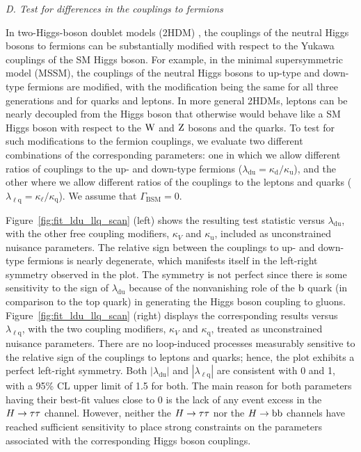 \documentclass[12pt,twoside,a4paper,cmspaper,final,collab]{cms-tdr}
\begin{document}
\textit{D. Test for differences  in the couplings to fermions}

In  two-Higgs-boson doublet models (2HDM) \cite{Branco:2011iw}, the couplings of the neutral Higgs bosons to fermions
can be substantially modified with respect to the Yukawa couplings of the SM Higgs boson. For example,
in the minimal supersymmetric model (MSSM), the couplings of the neutral Higgs bosons to up-type and down-type fermions are modified,
with the modification being the same for all three generations and for quarks and leptons. In more
general 2HDMs, leptons can be nearly decoupled from the Higgs boson that otherwise would behave
like a SM Higgs boson with respect to the $\mathrm{W}$ and $\mathrm{Z}$ bosons and the quarks.
To test for such modifications to the fermion couplings,
we evaluate two different combinations of the corresponding parameters: one in which we allow
different ratios of couplings to the up- and down-type fermions
($\lambda_{\mathrm{du}} = \kappa_{\mathrm{d}} / \kappa_{\mathrm{u}}$),
and the other where we allow different ratios of the couplings to the leptons and quarks
($\lambda_{\ell\mathrm{q}} = \kappa_{\ell} / \kappa_{\mathrm{q}}$).
We assume that $\Gamma_{\mathrm{BSM}}=0$.

Figure~\ref{fig:fit_ldu_llq_scan} (left) shows the resulting test statistic versus
$\lambda_{\mathrm{du}}$, with the other free coupling modifiers,
$\kappa_V$ and $\kappa_{\mathrm{u}}$, included as
unconstrained nuisance parameters. The relative sign between the couplings to up- and down-type fermions
is nearly degenerate, which manifests itself in the left-right symmetry
observed in the plot. The symmetry is not perfect since there is some sensitivity
to the sign of $\lambda_{\mathrm{du}}$ because of the nonvanishing role
of the $\mathrm{b}$ quark (in comparison to the top quark) in generating the Higgs boson coupling to gluons.
Figure~\ref{fig:fit_ldu_llq_scan} (right) displays the corresponding results versus
$\lambda_{\ell \mathrm{q}}$, with the two coupling modifiers,
$\kappa_V$ and $\kappa_{\mathrm{q}}$,
treated as unconstrained nuisance parameters. There are no loop-induced processes
measurably sensitive to the relative sign of the couplings to leptons and quarks; hence,
the plot exhibits a perfect left-right symmetry.
Both $| \lambda_{\mathrm{du}} |$ and $| \lambda_{\ell \mathrm{q}} |$ are
consistent with 0 and 1, with a 95\% CL upper limit of 1.5 for both.
The main reason for both parameters  having their best-fit values close to 0
is the lack of any event excess in the $H \to \tau\tau$
channel. However, neither the $H \to \tau\tau$
nor the $H \to \mathrm{b}\mathrm{b}$ channels have reached sufficient sensitivity to place strong
constraints on the parameters associated with the corresponding Higgs boson couplings.
\end{document}
